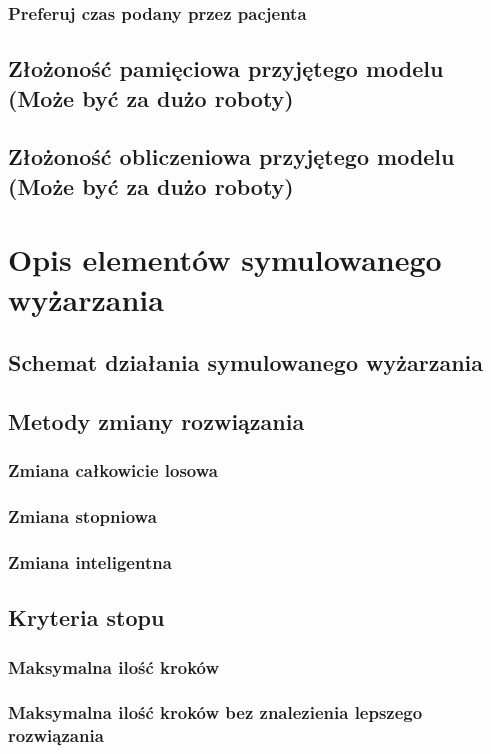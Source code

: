\subsection{Preferuj czas podany przez pacjenta}
\section{Złożoność pamięciowa przyjętego modelu (Może być za dużo roboty)}
\section{Złożoność obliczeniowa przyjętego modelu (Może być za dużo roboty)}

\chapter{Opis elementów symulowanego wyżarzania}

\section{Schemat działania symulowanego wyżarzania}

\section{Metody zmiany rozwiązania}
\subsection{Zmiana całkowicie losowa}
\subsection{Zmiana stopniowa}
\subsection{Zmiana inteligentna}

\section{Kryteria stopu}
\subsection{Maksymalna ilość kroków}
\subsection{Maksymalna ilość kroków bez znalezienia lepszego rozwiązania}
